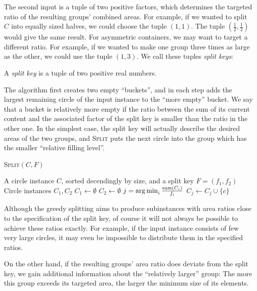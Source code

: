 \documentclass[a4paper,style=print,bibliography=totoc,nexus,lnum,extramargin]{tubsbook}
\begin{document}
The second input is a tuple of two positive factors, which determines the targeted ratio of the resulting groups' combined areas. For example, if we wanted to split $C$ into equally sized halves, we could choose the tuple $(1,1)$. The tuple $(\frac 1 2,\frac 1 2)$ would give the same result.
For asymmetric containers, we may want to target a different ratio. For example, if we wanted to make one group three times as large as the other, we could use the tuple $(1,3)$. We call these tuples \emph{split keys}:

\begin{definition}
    A \emph{split key} is a tuple of two positive real numbers.
\end{definition}

The algorithm first creates two empty “buckets”, and in each step adds the largest remaining circle of the input instance to the “more empty” bucket. We say that a bucket is relatively more empty if the ratio between the sum of its current content and the associated factor of the split key is smaller than the ratio in the other one.
In the simplest case, the split key will actually describe the desired areas of the two groups, and \textsc{Split} puts the next circle into the group which has the smaller “relative filling level”.

\begin{algorithm}
    \caption{\textsc{Split}$(C,F)$}
    \label{alg:split}
    \begin{algorithmic}
        \Require A circle instance $C$, sorted decendingly by size, and a split key $F = (f_1, f_2)$
        \Ensure Circle instances $C_1, C_2$
        \State $C_1 \gets \emptyset$
        \State $C_2 \gets \emptyset$
            \State $j = \operatorname*{arg\,min}_{i} \frac{\operatorname{sum}(C_i)}{f_i}$
            \State $C_j \gets C_j \cup \{c\}$
        \EndFor
    \end{algorithmic}
\end{algorithm}

Although the greedy splitting aims to produce subinstances with area ratios close to the specification of the split key, of course it will not always be possible to achieve these ratios exactly. For example, if the input instance consists of few very large circles, it may even be impossible to distribute them in the specified ratios.

On the other hand, if the resulting groups' area ratio does deviate from the split key, we gain additional information about the “relatively larger” group: The more this group exceeds its targeted area, the larger the minimum size of its elements.
\end{document}
